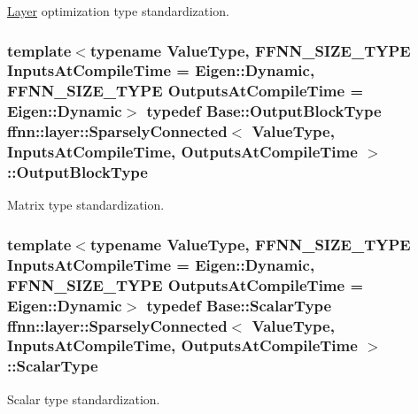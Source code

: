 \hyperlink{classffnn_1_1layer_1_1_layer}{Layer} optimization type standardization. 

\hypertarget{classffnn_1_1layer_1_1_sparsely_connected_aacf4fb49a3f57aba90e55d8d3c63cf45}{
\subsubsection[{Output\-Block\-Type}]{\setlength{\rightskip}{0pt plus 5cm}template$<$typename Value\-Type, F\-F\-N\-N\-\_\-\-S\-I\-Z\-E\-\_\-\-T\-Y\-P\-E Inputs\-At\-Compile\-Time = Eigen\-::\-Dynamic, F\-F\-N\-N\-\_\-\-S\-I\-Z\-E\-\_\-\-T\-Y\-P\-E Outputs\-At\-Compile\-Time = Eigen\-::\-Dynamic$>$ typedef Base\-::\-Output\-Block\-Type {\bf ffnn\-::layer\-::\-Sparsely\-Connected}$<$ Value\-Type, Inputs\-At\-Compile\-Time, Outputs\-At\-Compile\-Time $>$\-::{\bf Output\-Block\-Type}}}\label{classffnn_1_1layer_1_1_sparsely_connected_aacf4fb49a3f57aba90e55d8d3c63cf45}


Matrix type standardization. 

\hypertarget{classffnn_1_1layer_1_1_sparsely_connected_abe2b75254f39c0bec9f02b2e906e7919}{
\subsubsection[{Scalar\-Type}]{\setlength{\rightskip}{0pt plus 5cm}template$<$typename Value\-Type, F\-F\-N\-N\-\_\-\-S\-I\-Z\-E\-\_\-\-T\-Y\-P\-E Inputs\-At\-Compile\-Time = Eigen\-::\-Dynamic, F\-F\-N\-N\-\_\-\-S\-I\-Z\-E\-\_\-\-T\-Y\-P\-E Outputs\-At\-Compile\-Time = Eigen\-::\-Dynamic$>$ typedef {\bf Base\-::\-Scalar\-Type} {\bf ffnn\-::layer\-::\-Sparsely\-Connected}$<$ Value\-Type, Inputs\-At\-Compile\-Time, Outputs\-At\-Compile\-Time $>$\-::{\bf Scalar\-Type}}}\label{classffnn_1_1layer_1_1_sparsely_connected_abe2b75254f39c0bec9f02b2e906e7919}


Scalar type standardization. 

